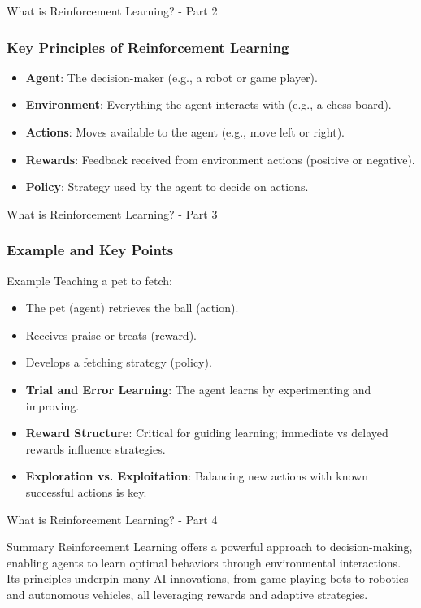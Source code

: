 \documentclass[aspectratio=169]{beamer}
\begin{document}
\begin{frame}[fragile]{What is Reinforcement Learning? - Part 2}
    \frametitle{Key Principles of Reinforcement Learning}
  
    \begin{itemize}
        \item \textbf{Agent}: The decision-maker (e.g., a robot or game player).
        \item \textbf{Environment}: Everything the agent interacts with (e.g., a chess board).
        \item \textbf{Actions}: Moves available to the agent (e.g., move left or right).
        \item \textbf{Rewards}: Feedback received from environment actions (positive or negative).
        \item \textbf{Policy}: Strategy used by the agent to decide on actions.
    \end{itemize}
\end{frame}

\begin{frame}[fragile]{What is Reinforcement Learning? - Part 3}
    \frametitle{Example and Key Points}
    
    \begin{block}{Example}
        Teaching a pet to fetch:
        \begin{itemize}
            \item The pet (agent) retrieves the ball (action).
            \item Receives praise or treats (reward).
            \item Develops a fetching strategy (policy).
        \end{itemize}
    \end{block}

    \begin{itemize}
        \item \textbf{Trial and Error Learning}: The agent learns by experimenting and improving.
        \item \textbf{Reward Structure}: Critical for guiding learning; immediate vs delayed rewards influence strategies.
        \item \textbf{Exploration vs. Exploitation}: Balancing new actions with known successful actions is key.
    \end{itemize}
\end{frame}

\begin{frame}[fragile]{What is Reinforcement Learning? - Part 4}
    \begin{block}{Summary}
        Reinforcement Learning offers a powerful approach to decision-making, enabling agents to learn optimal behaviors through environmental interactions. 
        Its principles underpin many AI innovations, from game-playing bots to robotics and autonomous vehicles, all leveraging rewards and adaptive strategies.
    \end{block}
\end{frame}
\end{document}
